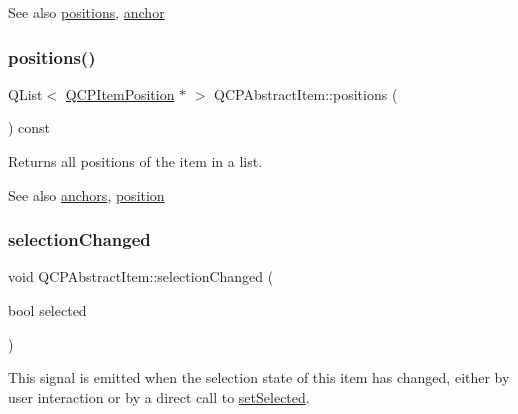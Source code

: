 \begin{DoxySeeAlso}{See also}
\mbox{\hyperlink{class_q_c_p_abstract_item_a709f655ac3f7f22d452714134662b454}{positions}}, \mbox{\hyperlink{class_q_c_p_abstract_item_a139c255ea8831642fac91748e29a5adb}{anchor}} 
\end{DoxySeeAlso}
\mbox{\label{class_q_c_p_abstract_item_a709f655ac3f7f22d452714134662b454}} 
\subsubsection{\texorpdfstring{positions()}{positions()}}
{\footnotesize\ttfamily Q\+List$<$ \mbox{\hyperlink{class_q_c_p_item_position}{Q\+C\+P\+Item\+Position}} $\ast$ $>$ Q\+C\+P\+Abstract\+Item\+::positions (\begin{DoxyParamCaption}{ }\end{DoxyParamCaption}) const\hspace{0.3cm}{\ttfamily [inline]}}

Returns all positions of the item in a list.

\begin{DoxySeeAlso}{See also}
\mbox{\hyperlink{class_q_c_p_abstract_item_a81d1ecfea3368b836cf9675a0045e659}{anchors}}, \mbox{\hyperlink{class_q_c_p_abstract_item_a2589c3d298f9a576d77d9addb440a18d}{position}} 
\end{DoxySeeAlso}
\mbox{\label{class_q_c_p_abstract_item_aa5cffb034fc65dbb91c77e02c1c14251}} 
\subsubsection{\texorpdfstring{selection\+Changed}{selectionChanged}}
{\footnotesize\ttfamily void Q\+C\+P\+Abstract\+Item\+::selection\+Changed (\begin{DoxyParamCaption}\item[{bool}]{selected }\end{DoxyParamCaption})\hspace{0.3cm}{\ttfamily [signal]}}

This signal is emitted when the selection state of this item has changed, either by user interaction or by a direct call to \mbox{\hyperlink{class_q_c_p_abstract_item_a203de94ad586cc44d16c9565f49d3378}{set\+Selected}}. \mbox{\label{class_q_c_p_abstract_item_ae41d0349d68bb802c49104afd100ba2a}} 
